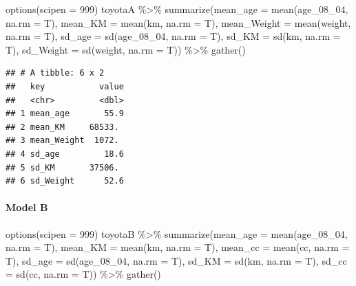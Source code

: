 \documentclass[
]{article}
\newenvironment{Shaded}{\begin{snugshade}}{\end{snugshade}}
\newcommand{\AttributeTok}[1]{\textcolor[rgb]{0.77,0.63,0.00}{#1}}
\newcommand{\DecValTok}[1]{\textcolor[rgb]{0.00,0.00,0.81}{#1}}
\newcommand{\FunctionTok}[1]{\textcolor[rgb]{0.00,0.00,0.00}{#1}}
\newcommand{\NormalTok}[1]{#1}
\newcommand{\SpecialCharTok}[1]{\textcolor[rgb]{0.00,0.00,0.00}{#1}}
\begin{document}
\begin{Shaded}
\begin{Highlighting}[]
\FunctionTok{options}\NormalTok{(}\AttributeTok{scipen =} \DecValTok{999}\NormalTok{) }
\NormalTok{toyotaA }\SpecialCharTok{\%\textgreater{}\%} \FunctionTok{summarize}\NormalTok{(}\AttributeTok{mean\_age =} \FunctionTok{mean}\NormalTok{(age\_08\_04, }\AttributeTok{na.rm =}\NormalTok{ T),}
                      \AttributeTok{mean\_KM =} \FunctionTok{mean}\NormalTok{(km, }\AttributeTok{na.rm =}\NormalTok{ T),}
                      \AttributeTok{mean\_Weight =} \FunctionTok{mean}\NormalTok{(weight, }\AttributeTok{na.rm =}\NormalTok{ T),}
                      \AttributeTok{sd\_age =} \FunctionTok{sd}\NormalTok{(age\_08\_04, }\AttributeTok{na.rm =}\NormalTok{ T),}
                      \AttributeTok{sd\_KM =} \FunctionTok{sd}\NormalTok{(km, }\AttributeTok{na.rm =}\NormalTok{ T),}
                      \AttributeTok{sd\_Weight =} \FunctionTok{sd}\NormalTok{(weight, }\AttributeTok{na.rm =}\NormalTok{ T)) }\SpecialCharTok{\%\textgreater{}\%} 
  \FunctionTok{gather}\NormalTok{()}
\end{Highlighting}
\end{Shaded}

\begin{verbatim}
## # A tibble: 6 x 2
##   key           value
##   <chr>         <dbl>
## 1 mean_age       55.9
## 2 mean_KM     68533. 
## 3 mean_Weight  1072. 
## 4 sd_age         18.6
## 5 sd_KM       37506. 
## 6 sd_Weight      52.6
\end{verbatim}

\hypertarget{model-b-5}{%
\paragraph{Model B}\label{model-b-5}}

\begin{Shaded}
\begin{Highlighting}[]
\FunctionTok{options}\NormalTok{(}\AttributeTok{scipen =} \DecValTok{999}\NormalTok{) }
\NormalTok{toyotaB }\SpecialCharTok{\%\textgreater{}\%} \FunctionTok{summarize}\NormalTok{(}\AttributeTok{mean\_age =} \FunctionTok{mean}\NormalTok{(age\_08\_04, }\AttributeTok{na.rm =}\NormalTok{ T),}
                      \AttributeTok{mean\_KM =} \FunctionTok{mean}\NormalTok{(km, }\AttributeTok{na.rm =}\NormalTok{ T),}
                      \AttributeTok{mean\_cc =} \FunctionTok{mean}\NormalTok{(cc, }\AttributeTok{na.rm =}\NormalTok{ T),}
                      \AttributeTok{sd\_age =} \FunctionTok{sd}\NormalTok{(age\_08\_04, }\AttributeTok{na.rm =}\NormalTok{ T),}
                      \AttributeTok{sd\_KM =} \FunctionTok{sd}\NormalTok{(km, }\AttributeTok{na.rm =}\NormalTok{ T),}
                      \AttributeTok{sd\_cc =} \FunctionTok{sd}\NormalTok{(cc, }\AttributeTok{na.rm =}\NormalTok{ T)) }\SpecialCharTok{\%\textgreater{}\%} 
  \FunctionTok{gather}\NormalTok{()}
\end{Highlighting}
\end{Shaded}
\end{document}
